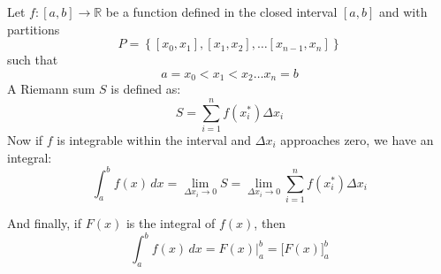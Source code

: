 Let \( f: [a,b] \to \mathbb{R} \) be a function defined in the closed interval \( [a,b] \) and with partitions
\begin{equation*}
    P = \left \{ 
        [x_0,x_1], [x_1,x_2], \dots [x_{n-1},x_n]
     \right \}
\end{equation*}
such that
\begin{equation*}
    a = x_0 < x_1 < x_2 \dots x_n = b
\end{equation*}
A Riemann sum \( S \) is defined as:
\begin{equation}
    S = \sum_{i=1}^{n} f(x_i^*) \Delta x_i
\end{equation}
Now if \( f \) is integrable within the interval and \( \Delta x_i \) approaches zero, we have an integral:
\begin{equation}
    \int_a^b f(x) \,dx= \lim_{\Delta x_i \to 0}S = \lim_{\Delta x_i \to 0} \sum_{i=1}^{n} f(x_i^*) \Delta x_i 
\end{equation}

And finally, if \( F(x) \) is the integral of \( f(x) \), then
\begin{equation*}
    \int_a^b f(x) \,dx = F(x)\Big|_a^b = \Big[F(x)\Big]_a^b
\end{equation*}
